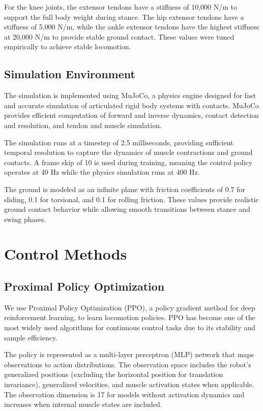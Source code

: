 \documentclass[conference]{IEEEtran}
\begin{document}
For the knee joints, the extensor tendons have a stiffness of 10,000 N/m to support the full body weight during stance. The hip extensor tendons have a stiffness of 5,000 N/m, while the ankle extensor tendons have the highest stiffness at 20,000 N/m to provide stable ground contact. These values were tuned empirically to achieve stable locomotion.

\subsection{Simulation Environment}

The simulation is implemented using MuJoCo, a physics engine designed for fast and accurate simulation of articulated rigid body systems with contacts. MuJoCo provides efficient computation of forward and inverse dynamics, contact detection and resolution, and tendon and muscle simulation.

The simulation runs at a timestep of 2.5 milliseconds, providing sufficient temporal resolution to capture the dynamics of muscle contractions and ground contacts. A frame skip of 10 is used during training, meaning the control policy operates at 40 Hz while the physics simulation runs at 400 Hz.

The ground is modeled as an infinite plane with friction coefficients of 0.7 for sliding, 0.1 for torsional, and 0.1 for rolling friction. These values provide realistic ground contact behavior while allowing smooth transitions between stance and swing phases.

\section{Control Methods}

\subsection{Proximal Policy Optimization}

We use Proximal Policy Optimization (PPO), a policy gradient method for deep reinforcement learning, to learn locomotion policies. PPO has become one of the most widely used algorithms for continuous control tasks due to its stability and sample efficiency.

The policy is represented as a multi-layer perceptron (MLP) network that maps observations to action distributions. The observation space includes the robot's generalized positions (excluding the horizontal position for translation invariance), generalized velocities, and muscle activation states when applicable. The observation dimension is 17 for models without activation dynamics and increases when internal muscle states are included.
\end{document}
